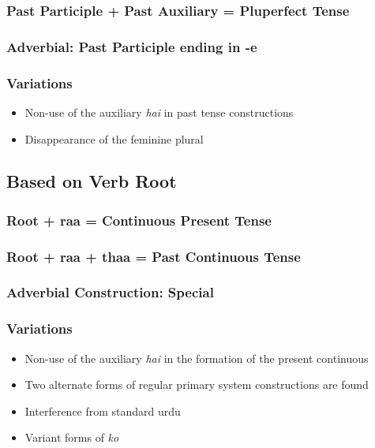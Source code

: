 \documentclass[a4paper]{article}
\begin{document}
\subsubsection{Past Participle + Past Auxiliary = Pluperfect Tense}
\subsubsection{Adverbial: Past Participle ending in -e}

\subsubsection{Variations}

\begin{itemize}
\item
Non-use of the auxiliary \textit{hai} in past tense constructions
\item
Disappearance of the feminine plural
\end{itemize}

\subsection{Based on Verb Root}

\subsubsection{Root + raa = Continuous Present Tense}
\subsubsection{Root + raa + thaa = Past Continuous Tense}
\subsubsection{Adverbial Construction: Special}

\subsubsection{Variations}

\begin{itemize}
\item
Non-use of the auxiliary \textit{hai} in the formation of the present continuous
\item
Two alternate forms of regular primary system constructions are found
\item
Interference from standard urdu
\item
Variant forms of \textit{ko}
\end{itemize}
\end{document}
